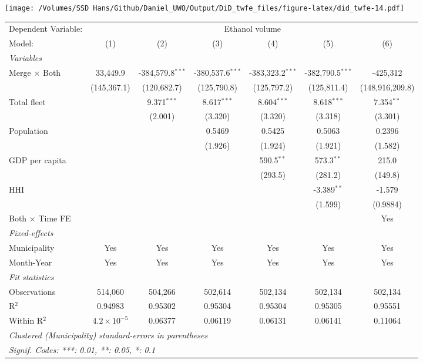 \documentclass[
]{article}
\begin{document}
\texttt{[image: /Volumes/SSD Hans/Github/Daniel\_UWO/Output/DiD\_twfe\_files/figure-latex/did\_twfe-14.pdf]}

\begin{tabular}{lcccccc}
\tabularnewline\midrule\midrule
Dependent Variable:&\multicolumn{6}{c}{Ethanol volume}\\
Model:&(1) & (2) & (3) & (4) & (5) & (6)\\
\midrule \emph{Variables}&   &   &   &   &   &  \\
Merge $\times $ Both & 33,449.9 & -384,579.8$^{***}$ & -380,537.6$^{***}$ & -383,323.2$^{***}$ & -382,790.5$^{***}$ & -425,312\\
  &(145,367.1) & (120,682.7) & (125,790.8) & (125,797.2) & (125,811.4) & (148,916,209.8)\\
Total fleet &    & 9.371$^{***}$ & 8.617$^{***}$ & 8.604$^{***}$ & 8.618$^{***}$ & 7.354$^{**}$\\
  &   & (2.001) & (3.320) & (3.320) & (3.318) & (3.301)\\
Population &    &    & 0.5469 & 0.5425 & 0.5063 & 0.2396\\
  &   &    & (1.926) & (1.924) & (1.921) & (1.582)\\
GDP per capita &    &    &    & 590.5$^{**}$ & 573.3$^{**}$ & 215.0\\
  &   &    &    & (293.5) & (281.2) & (149.8)\\
HHI &    &    &    &    & -3.389$^{**}$ & -1.579\\
  &   &    &    &    & (1.599) & (0.9884)\\
Both $\times$ Time FE &  &  &  &  &  & Yes\\
\midrule \emph{Fixed-effects}&   &   &   &   &   &  \\
Municipality & Yes & Yes & Yes & Yes & Yes & Yes\\
Month-Year & Yes & Yes & Yes & Yes & Yes & Yes\\
\midrule \emph{Fit statistics}&  & & & & & \\
Observations & 514,060&504,266&502,614&502,134&502,134&502,134\\
R$^2$ & 0.94983&0.95302&0.95304&0.95304&0.95305&0.95551\\
Within R$^2$ & $4.2\times 10^{-5}$&0.06377&0.06119&0.06131&0.06141&0.11064\\
\midrule\midrule\multicolumn{7}{l}{\emph{Clustered (Municipality) standard-errors in parentheses}}\\
\multicolumn{7}{l}{\emph{Signif. Codes: ***: 0.01, **: 0.05, *: 0.1}}\\
\end{tabular}
\end{document}
